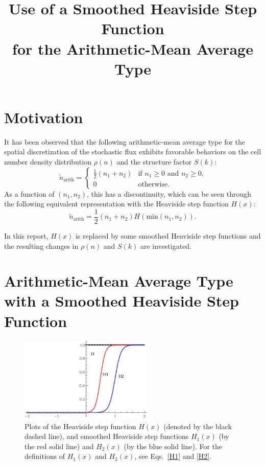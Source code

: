 \documentclass{article}
\begin{document}
\title{Use of a Smoothed Heaviside Step Function \\ for the Arithmetic-Mean Average Type}

\date{}

\maketitle

\section{Motivation}

It has been observed that the following arithmetic-mean average type for the spatial discretization of the stochastic flux exhibits favorable behaviors on the cell number density distribution $\rho(n)$ and the structure factor $S(k)$:
\begin{equation}
\tilde{n}_\mathrm{arith}=
\begin{cases} 
\frac12(n_1+n_2) & \mbox{if $n_1\ge0$ and $n_2\ge0$,} \\ 
0 & \mbox{otherwise.}
\end{cases}
\end{equation}
As a function of $(n_1,n_2)$, this has a discontinuity, which can be seen through the following equivalent representation with the Heaviside step function $H(x)$:
\begin{equation}
\tilde{n}_\mathrm{arith} = \frac{1}{2}(n_1+n_2)H(\mathrm{min}(n_1,n_2)).
\end{equation}

In this report, $H(x)$ is replaced by some smoothed Heaviside step functions and the resulting changes in $\rho(n)$ and $S(k)$ are investigated.

\section{Arithmetic-Mean Average Type with a Smoothed Heaviside Step Function} 

\begin{figure}[t]
\centering
\includegraphics[width=2.5in]{fig2/heaviside.jpg}
\caption{\label{fig_heaviside}Plots of the Heaviside step function $H(x)$ (denoted by the black dashed line), and smoothed Heaviside step functions $H_1(x)$ (by the red solid line) and $H_2(x)$ (by the blue solid line). For the definitions of $H_1(x)$ and $H_2(x)$, see Eqs.~\eqref{H1} and \eqref{H2}.}
\end{figure}
\end{document}

